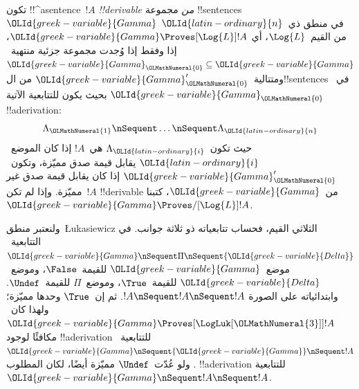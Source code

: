 \documentclass[../../../include/open-logic-section]{subfiles}
\begin{document}
\begin{defn}[!!^{derivability}]
تكون !!^a{sentence}~$!A$ \emph{!!{derivable} من} مجموعة
!!{sentence}s~${\OLId{greek-variable}{Gamma}}$ في منطق ذي~${\OLId{latin-ordinary}{n}}$ من القيم~$\Log{L}$، أي
${\OLId{greek-variable}{Gamma}} \Proves[\Log{L}] !A$، إذا وفقط إذا وُجدت مجموعة جزئية
منتهية~${\OLId{greek-variable}{Gamma}}_{\OLMathNumeral{0}} \subseteq {\OLId{greek-variable}{Gamma}}$ ومتتالية~${\OLId{greek-variable}{Gamma}}_{\OLMathNumeral{0}}'$ من
ال!!{sentence}s في~${\OLId{greek-variable}{Gamma}}_{\OLMathNumeral{0}}$ بحيث يكون للتتابعية الآتية
!!a{derivation}:
\[ \Lambda_{\OLMathNumeral{1}} \nSequent \dots \nSequent \Lambda_{\OLId{latin-ordinary}{n}} \]
حيث تكون~$\Lambda_{\OLId{latin-ordinary}{i}}$ هي~$!A$ إذا كان الموضع~${\OLId{latin-ordinary}{i}}$ يقابل قيمة صدق
مميّزة، وتكون~${\OLId{greek-variable}{Gamma}}_{\OLMathNumeral{0}}'$ إذا كان يقابل قيمة صدق غير مميّزة. وإذا لم
تكن~$!A$ !!{derivable} من~${\OLId{greek-variable}{Gamma}}$، كتبنا
${\OLId{greek-variable}{Gamma}} \Proves/[\Log{L}] !A$.
\end{defn}

ولنعتبر منطق~\L ukasiewicz الثلاثي القيم، فحساب تتابعياته ذو ثلاثة
جوانب. في التتابعية~${\OLId{greek-variable}{Gamma}} \nSequent \Pi \nSequent {\OLId{greek-variable}{Delta}}$
موضع~${\OLId{greek-variable}{Gamma}}$ للقيمة~$\False$، وموضع~${\OLId{greek-variable}{Delta}}$ للقيمة~$\True$،
وموضع~$\Pi$ للقيمة~$\Undef$. وابتدائياته على الصورة
$!A \nSequent !A \nSequent !A$. ثم إن~$\True$ وحدها مميّزة؛
ولهذا كان~${\OLId{greek-variable}{Gamma}} \Proves[\LogLuk[{\OLMathNumeral{3}}]] !A$ مكافئًا لوجود
!!a{derivation} للتتابعية~${\OLId{greek-variable}{Gamma}} \nSequent {\OLId{greek-variable}{Gamma}} \nSequent !A$.
ولو عُدّت~$\Undef$ مميّزة أيضًا، لكان المطلوب !!a{derivation}
للتتابعية~${\OLId{greek-variable}{Gamma}} \nSequent !A \nSequent !A$.
\end{document}
